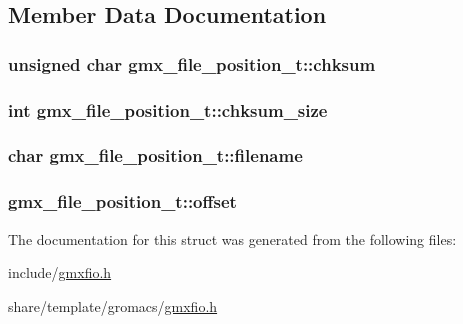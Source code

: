 \subsection{\-Member \-Data \-Documentation}
\hypertarget{structgmx__file__position__t_a8d9f583a2435adc8db9e3c31114732b2}{
\subsubsection[{chksum}]{\setlength{\rightskip}{0pt plus 5cm}unsigned char {\bf gmx\-\_\-file\-\_\-position\-\_\-t\-::chksum}}}\label{structgmx__file__position__t_a8d9f583a2435adc8db9e3c31114732b2}
\hypertarget{structgmx__file__position__t_a9f8367fc49db11350e1d20a054d829c6}{
\subsubsection[{chksum\-\_\-size}]{\setlength{\rightskip}{0pt plus 5cm}int {\bf gmx\-\_\-file\-\_\-position\-\_\-t\-::chksum\-\_\-size}}}\label{structgmx__file__position__t_a9f8367fc49db11350e1d20a054d829c6}
\hypertarget{structgmx__file__position__t_ab21db5925d4c230c6af4b61c3a52b4b6}{
\subsubsection[{filename}]{\setlength{\rightskip}{0pt plus 5cm}char {\bf gmx\-\_\-file\-\_\-position\-\_\-t\-::filename}}}\label{structgmx__file__position__t_ab21db5925d4c230c6af4b61c3a52b4b6}
\hypertarget{structgmx__file__position__t_a505ec19a84ba674c782e47dae8cf6ba3}{
\subsubsection[{offset}]{ {\bf gmx\-\_\-file\-\_\-position\-\_\-t\-::offset}}}\label{structgmx__file__position__t_a505ec19a84ba674c782e47dae8cf6ba3}


\-The documentation for this struct was generated from the following files\-:\begin{DoxyCompactItemize}
\item 
include/\hyperlink{include_2gmxfio_8h}{gmxfio.\-h}\item 
share/template/gromacs/\hyperlink{share_2template_2gromacs_2gmxfio_8h}{gmxfio.\-h}\end{DoxyCompactItemize}
